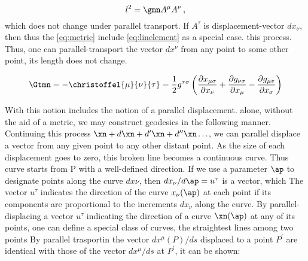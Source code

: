 {\begin{equation*}\label{eq:metric}
l^2 = \gmn A^\mu A^\nu\,,
\end{equation*}
%
which does not change under parallel transport. If $A^\tau$ is displacement-vector $dx_\nu$, then thus the \cref{eq:metric} include \cref{eq:linelement} as a special case. this process. Thus, one can parallel-transport the vector $dx^\nu$ from any point to some other point, its length does not change.





\begin{equation*}\label{eq:levicivita}
\Gtmn=-\christoffel{\mu}{\nu}{\tau} = \frac{1}{2} g^{\tau \sigma}\left(\frac{\partial x_{\mu \sigma}}{\partial x_{\nu}}+\frac{\partial g_{\nu \sigma}}{\partial x_{\mu}}-\frac{\partial g_{\mu v}}{\partial x_{\sigma}}\right)
\end{equation*}

With this notion includes the notion of a parallel displacement. alone, without the aid of a metric, we may construct geodesics in the following manner. Continuing this process $\xn+d\xn+d^{\prime} \xn+d^{\prime \prime} \xn \ldots$, we can parallel displace a vector from any given point to any other distant point. As the size of each displacement goes to zero, this broken line becomes a continuous curve. Thus curve starts from P with a well-defined direction. If we use a parameter $\ap$ to designate points along the curve $dx\nu$, then $dx_\nu/d\ap=u^\tau$ is a vector, which The vector $u^\tau$ indicates the direction of the curve $x_\nu(\ap)$ at each point if its components are proportional to the increments $dx_\nu$ along the curve. By parallel-displacing a vector $u^\tau$ indicating the direction of a curve $\xn(\ap)$ at any of its points, one can define a special class of curves, the straightest lines among two points By parallel trasportin the vector $d x^{\mu}(P) / d s$ displaced to a point $P^{\prime}$ are identical with those of the vector $d x^{\mu} / d s$ at $P^{\prime}$, it can be shown:

}
